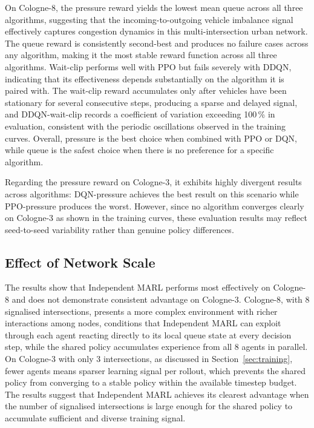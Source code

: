 On Cologne-8, the pressure reward yields the lowest mean queue across all three
algorithms, suggesting that the incoming-to-outgoing vehicle imbalance signal
effectively captures congestion dynamics in this multi-intersection urban
network. The queue reward is consistently second-best and produces no failure
cases across any algorithm, making it the most stable reward function across
all three algorithms. Wait-clip performs well with PPO but fails severely with
DDQN, indicating that its effectiveness depends substantially on the algorithm
it is paired with. The wait-clip reward accumulates only after vehicles have
been stationary for several consecutive steps, producing a sparse and delayed
signal, and DDQN-wait-clip records a coefficient of variation exceeding 100\,\%
in evaluation, consistent with the periodic oscillations observed in the
training curves. Overall, pressure is the best choice when combined with PPO
or DQN, while queue is the safest choice when there is no preference for a
specific algorithm.

Regarding the pressure reward on Cologne-3, it exhibits highly divergent
results across algorithms: DQN-pressure achieves the best result on this
scenario while PPO-pressure produces the worst. However, since no algorithm
converges clearly on Cologne-3 as shown in the training curves, these
evaluation results may reflect seed-to-seed variability rather than genuine
policy differences.

\subsection{Effect of Network Scale}

The results show that Independent MARL performs most effectively on Cologne-8
and does not demonstrate consistent advantage on Cologne-3. Cologne-8, with
8 signalised intersections, presents a more complex environment with richer
interactions among nodes, conditions that Independent MARL can exploit through
each agent reacting directly to its local queue state at every decision step,
while the shared policy accumulates experience from all 8 agents in parallel.
On Cologne-3 with only 3 intersections, as discussed in
Section~\ref{sec:training}, fewer agents means sparser learning signal per
rollout, which prevents the shared policy from converging to a stable policy
within the available timestep budget. The results suggest that Independent MARL
achieves its clearest advantage when the number of signalised intersections is
large enough for the shared policy to accumulate sufficient and diverse training
signal.